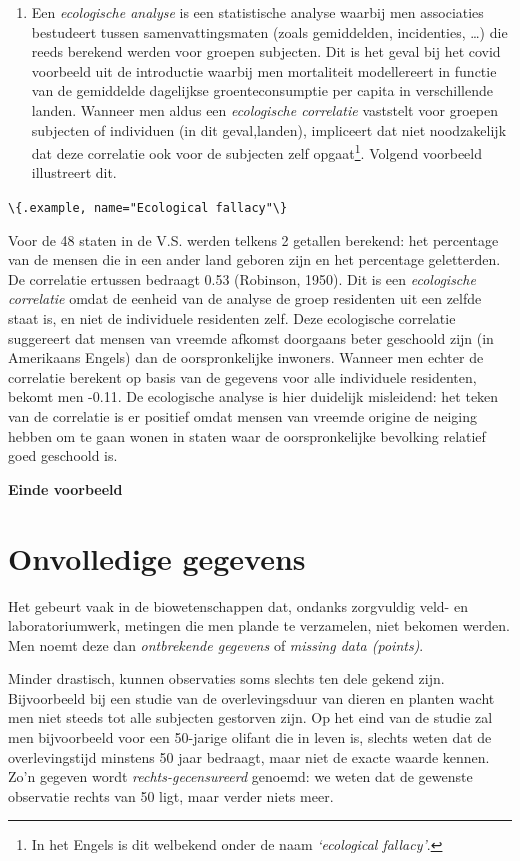 \documentclass[
  12pt,dutch,coursenotes]{book}
\newcommand{\passthrough}[1]{#1}
\begin{document}
\begin{enumerate}
\item
  Een \emph{ecologische analyse} is een statistische analyse waarbij men associaties bestudeert tussen samenvattingsmaten (zoals gemiddelden, incidenties, \ldots) die reeds berekend werden voor groepen subjecten. Dit is het geval bij het covid voorbeeld uit de introductie waarbij men mortaliteit modellereert in functie van de gemiddelde dagelijkse groenteconsumptie per capita in verschillende landen. Wanneer men aldus een \emph{ecologische correlatie} vaststelt voor groepen subjecten of individuen (in dit geval,landen), impliceert dat niet noodzakelijk dat deze correlatie ook voor de subjecten zelf opgaat\footnote{In het Engels is dit welbekend onder de naam \emph{`ecological fallacy'}.}. Volgend voorbeeld illustreert dit.
\end{enumerate}

\passthrough{\lstinline!\{.example, name="Ecological fallacy"\}!}

Voor de 48 staten in de V.S. werden telkens 2 getallen
berekend: het percentage van de mensen die in een ander land geboren zijn en het percentage geletterden. De correlatie ertussen bedraagt 0.53 (Robinson, 1950). Dit is een \emph{ecologische correlatie} omdat de eenheid van de analyse de groep residenten uit een zelfde staat is, en niet de individuele residenten zelf. Deze ecologische correlatie suggereert dat mensen van vreemde afkomst doorgaans beter geschoold zijn (in Amerikaans Engels) dan de oorspronkelijke inwoners. Wanneer men echter de correlatie berekent op basis
van de gegevens voor alle individuele residenten, bekomt men -0.11. De ecologische analyse is hier duidelijk misleidend: het teken van de correlatie is er positief omdat mensen van vreemde origine de neiging hebben om te gaan wonen in staten waar de oorspronkelijke bevolking relatief goed geschoold is.

\textbf{Einde voorbeeld}

\hypertarget{sec:missing}{%
\section{Onvolledige gegevens}\label{sec:missing}}

Het gebeurt vaak in de biowetenschappen dat, ondanks zorgvuldig veld- en laboratoriumwerk, metingen die men plande te verzamelen, niet bekomen werden. Men noemt deze dan \emph{ontbrekende gegevens} of \emph{missing data (points)}.

Minder drastisch, kunnen observaties soms slechts ten dele gekend zijn.
Bijvoorbeeld bij een studie van de overlevingsduur van dieren en planten wacht men niet steeds tot
alle subjecten gestorven zijn. Op het eind van de studie zal men bijvoorbeeld voor een 50-jarige
olifant die in leven is, slechts weten dat de overlevingstijd
minstens 50 jaar bedraagt, maar niet de exacte waarde kennen. Zo'n gegeven
wordt \emph{rechts-gecensureerd} genoemd: we weten dat de gewenste
observatie rechts van 50 ligt, maar verder niets meer.
\end{document}
